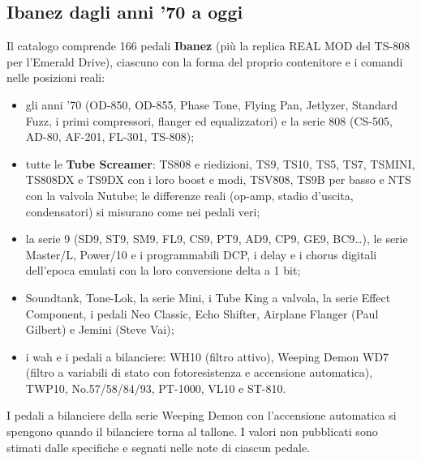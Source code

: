 \documentclass[11pt,a4paper]{article}
\begin{document}
\subsection{Ibanez dagli anni '70 a oggi}
Il catalogo comprende 166 pedali \textbf{Ibanez} (più la replica REAL MOD del TS-808 per l'Emerald Drive), ciascuno con
la forma del proprio contenitore e i comandi nelle posizioni reali:
\begin{itemize}
  \item gli anni '70 (OD-850, OD-855, Phase Tone, Flying Pan, Jetlyzer, Standard Fuzz, i primi compressori, flanger
        ed equalizzatori) e la serie 808 (CS-505, AD-80, AF-201, FL-301, TS-808);
  \item tutte le \textbf{Tube Screamer}: TS808 e riedizioni, TS9, TS10, TS5, TS7, TSMINI, TS808DX e TS9DX con i loro
        boost e modi, TSV808, TS9B per basso e NTS con la valvola Nutube; le differenze reali (op-amp, stadio d'uscita,
        condensatori) si misurano come nei pedali veri;
  \item la serie 9 (SD9, ST9, SM9, FL9, CS9, PT9, AD9, CP9, GE9, BC9\dots), le serie Master/L, Power/10 e i programmabili
        DCP, i delay e i chorus digitali dell'epoca emulati con la loro conversione delta a 1 bit;
  \item Soundtank, Tone-Lok, la serie Mini, i Tube King a valvola, la serie Effect Component, i pedali Neo Classic, Echo
        Shifter, Airplane Flanger (Paul Gilbert) e Jemini (Steve Vai);
  \item i wah e i pedali a bilanciere: WH10 (filtro attivo), Weeping Demon WD7 (filtro a variabili di stato con
        fotoresistenza e accensione automatica), TWP10, No.57/58/84/93, PT-1000, VL10 e ST-810.
\end{itemize}
I pedali a bilanciere della serie Weeping Demon con l'accensione automatica si spengono quando il bilanciere torna al
tallone. I valori non pubblicati sono stimati dalle specifiche e segnati nelle note di ciascun pedale.
\end{document}
